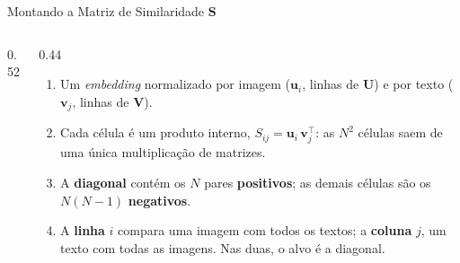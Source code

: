\documentclass[aspectratio=169,xcolor=dvipsnames]{beamer}
\begin{document}
\begin{frame}{Montando a Matriz de Similaridade $\mathbf{S}$}
\begin{columns}[c]
\begin{column}{0.52\textwidth}
      \end{column}
      \begin{column}{0.44\textwidth}
        \small
        \begin{enumerate}\setlength{\itemsep}{4pt}
          \item<1-> Um \textit{embedding} normalizado por imagem ($\mathbf{u}_i$, linhas de $\mathbf{U}$) e por texto ($\mathbf{v}_j$, linhas de $\mathbf{V}$).
          \item<2-> Cada célula é um produto interno, $S_{ij} = \mathbf{u}_i\,\mathbf{v}_j^{\top}$: as $N^2$ células saem de uma única multiplicação de matrizes.
          \item<3-> A \textcolor{ClipGreen}{\textbf{diagonal}} contém os $N$ pares \textbf{positivos}; as demais células são os $N(N{-}1)$ \textcolor{ClipRed}{\textbf{negativos}}.
          \item<4-> A \textcolor{ClipBlue}{\textbf{linha}} $i$ compara uma imagem com todos os textos; a \textcolor{ClipOrange}{\textbf{coluna}} $j$, um texto com todas as imagens. Nas duas, o alvo é a diagonal.
        \end{enumerate}
      \end{column}
    \end{columns}
  \end{frame}
\end{document}
